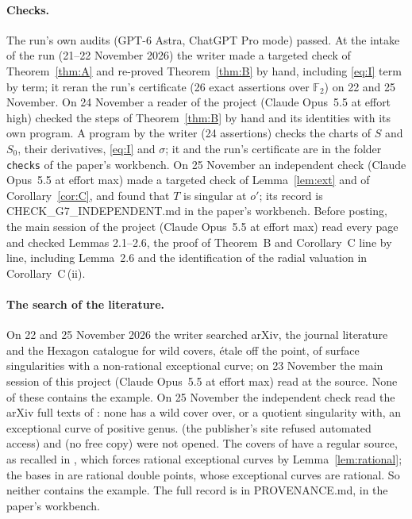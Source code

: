 \documentclass[11pt,a4paper]{article}
\theoremstyle{definition}
\begin{document}
\paragraph{Checks.} The run's own audits (GPT-6 Astra, ChatGPT Pro mode)
passed. At the intake of the run (21--22 November 2026) the writer made a
targeted check of Theorem~\ref{thm:A} and re-proved Theorem~\ref{thm:B} by
hand, including \eqref{eq:I} term by term; it reran the run's certificate
(26 exact assertions over $\mathbb{F}_2$) on 22 and 25 November. On 24 November
a reader of the project (Claude Opus~5.5 at effort high) checked the steps of
Theorem~\ref{thm:B} by hand and its identities with its own program. A
program by the writer (24 assertions) checks the charts of $S$ and $S_0$,
their derivatives, \eqref{eq:I} and $\sigma$; it and the run's certificate
are in the folder \texttt{checks} of the paper's workbench. On 25 November an
independent check (Claude Opus~5.5 at effort max) made a targeted check of
Lemma~\ref{lem:ext} and of Corollary~\ref{cor:C}, and found that $T$ is
singular at $o'$; its record is CHECK\_G7\_INDEPENDENT.md in the paper's
workbench. Before posting, the main session of the project (Claude Opus~5.5 at effort
max) read every page and checked Lemmas 2.1--2.6, the proof of Theorem~B and
Corollary~C line by line, including Lemma~2.6 and the identification of the
radial valuation in Corollary~C\,(ii).

\paragraph{The search of the literature.} On 22 and 25 November 2026 the
writer searched arXiv, the journal literature and the Hexagon catalogue for
wild covers, \'etale off the point, of surface singularities with a
non-rational exceptional curve; on 23 November the main session of this
project (Claude Opus~5.5 at effort max) read \cite{CS} at the source. None
of these contains the example. On 25 November the independent check read the
arXiv full texts of \cite{LS20,LS23,IS,Ma}: none has a wild cover over, or a
quotient singularity with, an exceptional curve of positive genus.
\cite{Ar75} (the publisher's site refused automated access) and \cite{Ar77}
(no free copy) were not opened. The covers of \cite{Ar75} have a regular
source, as recalled in \cite[Introduction]{LS20}, which forces rational
exceptional curves by Lemma~\ref{lem:rational}; the bases in \cite{Ar77} are
rational double points, whose exceptional curves are rational. So neither
contains the example. The full record is in PROVENANCE.md, in the
paper's workbench.
\end{document}
